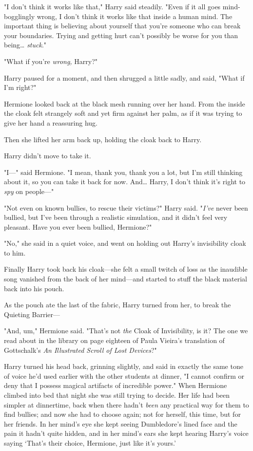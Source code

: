 "I don't think it works like that," Harry said steadily. "Even if it all goes 
mind-bogglingly wrong, I don't think it works like that inside a human mind. 
The important thing is believing about yourself that you're someone who can 
break your boundaries. Trying and getting hurt can't possibly be worse for you 
than being{\ldots} \emph{stuck}."

"What if you're \emph{wrong,} Harry?"

Harry paused for a moment, and then shrugged a little sadly, and said, "What if 
I'm right?"

Hermione looked back at the black mesh running over her hand. From the inside 
the cloak felt strangely soft and yet firm against her palm, as if it was 
trying to give her hand a reassuring hug.

Then she lifted her arm back up, holding the cloak back to Harry.

Harry didn't move to take it.

"I---" said Hermione. "I mean, thank you, thank you a lot, but I'm still 
thinking about it, so you can take it back for now. And{\ldots} Harry, I don't 
think it's right to \emph{spy} on people---"

"Not even on known bullies, to rescue their victims?" Harry said. "\emph{I've} 
never been bullied, but I've been through a realistic simulation, and it didn't 
feel very pleasant. Have you ever been bullied, Hermione?"

"No," she said in a quiet voice, and went on holding out Harry's invisibility 
cloak to him.

Finally Harry took back his cloak---she felt a small twitch of loss as the 
inaudible song vanished from the back of her mind---and started to stuff the 
black material back into his pouch.

As the pouch ate the last of the fabric, Harry turned from her, to break the 
Quieting Barrier---

"And, um," Hermione said. "That's not \emph{the} Cloak of Invisibility, is it? 
The one we read about in the library on page eighteen of Paula Vieira's 
translation of Gottschalk's \emph{An Illustrated Scroll of Lost Devices}?"

Harry turned his head back, grinning slightly, and said in exactly the same 
tone of voice he'd used earlier with the other students at dinner, "I cannot 
confirm or deny that I possess magical artifacts of incredible power."
\sbreak
When Hermione climbed into bed that night she was still trying to decide. Her 
life had been simpler at dinnertime, back when there hadn't \emph{been} any 
practical way for them to find bullies; and now she had to choose again; not 
for herself, this time, but for her friends. In her mind's eye she kept seeing 
Dumbledore's lined face and the pain it hadn't quite hidden, and in her mind's 
ears she kept hearing Harry's voice saying `That's their choice, Hermione, just 
like it's yours.'

